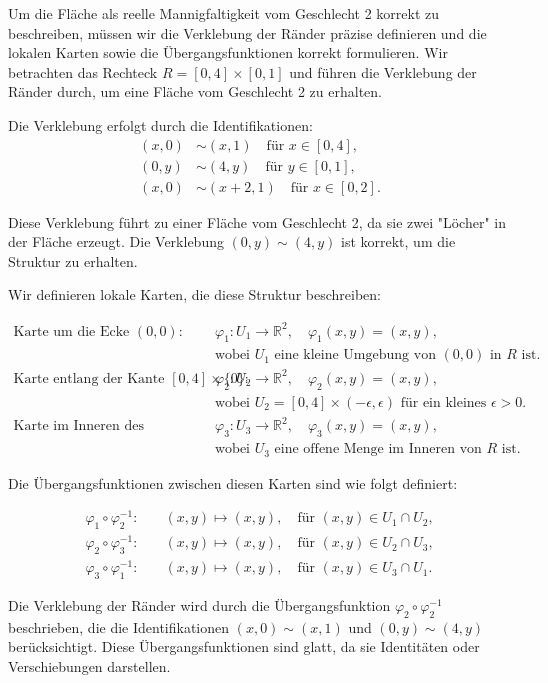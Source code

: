 Um die Fläche als reelle Mannigfaltigkeit vom Geschlecht 2 korrekt zu beschreiben, müssen wir die Verklebung der Ränder präzise definieren und die lokalen Karten sowie die Übergangsfunktionen korrekt formulieren. Wir betrachten das Rechteck $R = [0, 4] \times [0, 1]$ und führen die Verklebung der Ränder durch, um eine Fläche vom Geschlecht 2 zu erhalten.

Die Verklebung erfolgt durch die Identifikationen:
\begin{align*}
(x, 0) &\sim (x, 1) \quad \text{für } x \in [0, 4], \\
(0, y) &\sim (4, y) \quad \text{für } y \in [0, 1], \\
(x, 0) &\sim (x+2, 1) \quad \text{für } x \in [0, 2].
\end{align*}

Diese Verklebung führt zu einer Fläche vom Geschlecht 2, da sie zwei "Löcher" in der Fläche erzeugt. Die Verklebung $(0, y) \sim (4, y)$ ist korrekt, um die Struktur zu erhalten.

Wir definieren lokale Karten, die diese Struktur beschreiben:

\begin{align*}
\text{Karte um die Ecke } (0,0): \quad & \varphi_1: U_1 \to \mathbb{R}^2, \quad \varphi_1(x,y) = (x,y), \\
& \text{wobei } U_1 \text{ eine kleine Umgebung von } (0,0) \text{ in } R \text{ ist.} \\
\text{Karte entlang der Kante } [0,4] \times \{0\}: \quad & \varphi_2: U_2 \to \mathbb{R}^2, \quad \varphi_2(x,y) = (x,y), \\
& \text{wobei } U_2 = [0,4] \times (-\epsilon, \epsilon) \text{ für ein kleines } \epsilon > 0. \\
\text{Karte im Inneren des Rechtecks:} \quad & \varphi_3: U_3 \to \mathbb{R}^2, \quad \varphi_3(x,y) = (x,y), \\
& \text{wobei } U_3 \text{ eine offene Menge im Inneren von } R \text{ ist.}
\end{align*}

Die Übergangsfunktionen zwischen diesen Karten sind wie folgt definiert:

\begin{align*}
\varphi_1 \circ \varphi_2^{-1}: \quad & (x,y) \mapsto (x,y), \quad \text{für } (x,y) \in U_1 \cap U_2, \\
\varphi_2 \circ \varphi_3^{-1}: \quad & (x,y) \mapsto (x,y), \quad \text{für } (x,y) \in U_2 \cap U_3, \\
\varphi_3 \circ \varphi_1^{-1}: \quad & (x,y) \mapsto (x,y), \quad \text{für } (x,y) \in U_3 \cap U_1.
\end{align*}

Die Verklebung der Ränder wird durch die Übergangsfunktion $\varphi_2 \circ \varphi_2^{-1}$ beschrieben, die die Identifikationen $(x, 0) \sim (x, 1)$ und $(0, y) \sim (4, y)$ berücksichtigt. Diese Übergangsfunktionen sind glatt, da sie Identitäten oder Verschiebungen darstellen.

